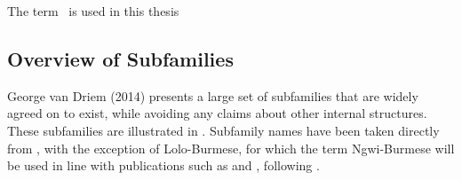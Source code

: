 The term \lfam\ is used in this thesis \lfamreason\

\subsection{Overview of Subfamilies}\label{ss:THOverview:Subfamilies}

George van Driem (2014) \nocite{VanDriem2014} presents a large set of subfamilies that are widely agreed on to exist, while avoiding any claims about other internal structures. These subfamilies are illustrated in . Subfamily names have been taken directly from , with the exception of Lolo-Burmese, for which the term Ngwi-Burmese will be used in line with publications such as  and , following .

